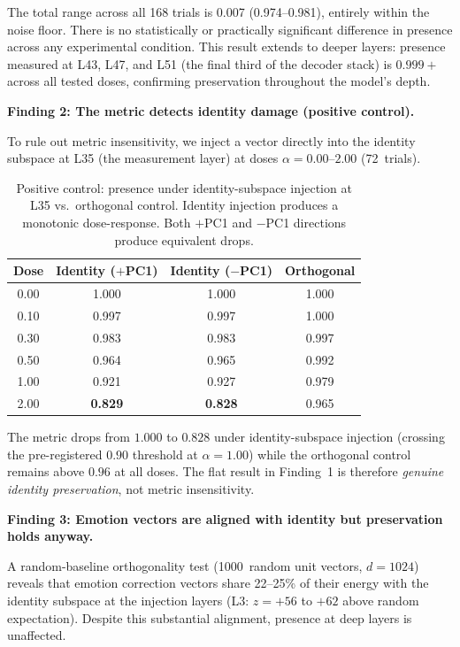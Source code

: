 \documentclass[11pt,a4paper]{article}
\begin{document}
The total range across all 168 trials is 0.007 (0.974--0.981), entirely
within the noise floor. There is no statistically or practically significant
difference in presence across any experimental condition. This result extends
to deeper layers: presence measured at L43, L47, and L51 (the final third of
the decoder stack) is $0.999{+}$ across all tested doses, confirming
preservation throughout the model's depth.

\textbf{Finding 2: The metric detects identity damage (positive control).}

To rule out metric insensitivity, we inject a vector directly into the
identity subspace at L35 (the measurement layer) at doses
$\alpha = 0.00$--$2.00$ (72~trials).

\begin{table}[H]
\centering
\caption{Positive control: presence under identity-subspace injection at
L35 vs.\ orthogonal control. Identity injection produces a monotonic
dose-response. Both $+$PC1 and $-$PC1 directions produce equivalent drops.}
\label{tab:positive_control}
\begin{tabular}{cccc}
\toprule
Dose & Identity ($+$PC1) & Identity ($-$PC1) & Orthogonal \\
\midrule
0.00 & 1.000 & 1.000 & 1.000 \\
0.10 & 0.997 & 0.997 & 1.000 \\
0.30 & 0.983 & 0.983 & 0.997 \\
0.50 & 0.964 & 0.965 & 0.992 \\
1.00 & 0.921 & 0.927 & 0.979 \\
2.00 & \textbf{0.829} & \textbf{0.828} & 0.965 \\
\bottomrule
\end{tabular}
\end{table}

The metric drops from $1.000$ to $0.828$ under identity-subspace injection
(crossing the pre-registered $0.90$ threshold at $\alpha{=}1.00$) while the
orthogonal control remains above $0.96$ at all doses. The flat result in
Finding~1 is therefore \emph{genuine identity preservation}, not metric
insensitivity.

\textbf{Finding 3: Emotion vectors are aligned with identity but
preservation holds anyway.}

A random-baseline orthogonality test (1000~random unit vectors, $d{=}1024$)
reveals that emotion correction vectors share 22--25\% of their energy with
the identity subspace at the injection layers (L3: $z{=}{+}56$ to ${+}62$
above random expectation). Despite this substantial alignment, presence at
deep layers is unaffected.
\end{document}
